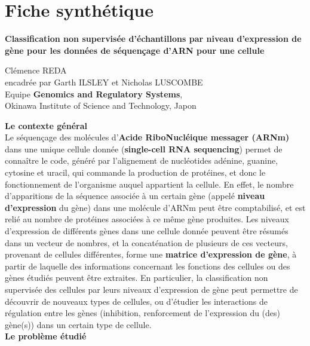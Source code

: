 \documentclass{report}
\begin{document}
{%

\chapter{Fiche synthétique}

\begin{center}\textbf{Classification non supervisée d'échantillons par niveau d'expression de gène pour les données de séquençage d'ARN pour une cellule}\end{center}

\begin{center}Clémence REDA\\ encadrée par Garth ILSLEY et Nicholas LUSCOMBE\\
Equipe \textbf{Genomics and Regulatory Systems},\\Okinawa Institute of Science and Technology, Japon\end{center}

\textbf{Le contexte général}\\

Le séquençage des molécules d'\textbf{Acide RiboNucléique messager (ARNm)} dans une unique cellule donnée (\textbf{single-cell RNA sequencing}) permet de connaître le code, généré par l'alignement de nucléotides adénine, guanine, cytosine et uracil, qui commande la production de protéines, et donc le fonctionnement de l'organisme auquel appartient la cellule. En effet, le nombre d'apparitions de la séquence associée à un certain gène (appelé \textbf{niveau d'expression} du gène) dans une molécule d'ARNm peut être comptabilisé, et est relié au nombre de protéines associées à ce même gène produites. Les niveaux d'expression de différents gènes dans une cellule donnée peuvent être résumés dans un vecteur de nombres, et la concaténation de plusieurs de ces vecteurs, provenant de cellules différentes, forme une \textbf{matrice d'expression de gène}, à partir de laquelle des informations concernant les fonctions des cellules ou des gènes étudiés peuvent être extraites. En particulier, la classification non supervisée des cellules par leurs niveaux d'expression de gène peut permettre de découvrir de nouveaux types de cellules, ou d'étudier les interactions de régulation entre les gènes (inhibition, renforcement de l'expression du (des) gène(s)) dans un certain type de cellule.\\

\textbf{Le problème étudié}\\

}
\end{document}
